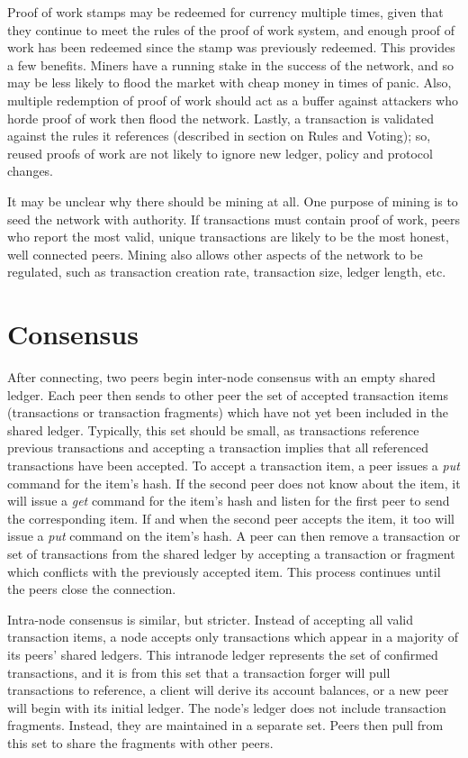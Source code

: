 \documentclass[10pt,twocolumn]{article}
\begin{document}
Proof of work stamps may be redeemed for currency multiple times, given that they continue to meet the rules of the proof of work system, and enough proof of work has been redeemed since the stamp was previously redeemed.  This provides a few benefits.  Miners have a running stake in the success of the network, and so may be less likely to flood the market with cheap money in times of panic.  Also, multiple redemption of proof of work should act as a buffer against attackers who horde proof of work then flood the network.  Lastly, a transaction is validated against the rules it references (described in section on Rules and Voting); so, reused proofs of work are not likely to ignore new ledger, policy and protocol changes.

It may be unclear why there should be mining at all.  One purpose of mining is to seed the network with authority.  If transactions must contain proof of work, peers who report the most valid, unique transactions are likely to be the most honest, well connected peers.  Mining also allows other aspects of the network to be regulated, such as transaction creation rate, transaction size, ledger length, etc.

\section{Consensus}
After connecting, two peers begin inter-node consensus with an empty shared ledger.  Each peer then sends to other peer the set of accepted transaction items (transactions or transaction fragments) which have not yet been included in the shared ledger.  Typically, this set should be small, as transactions reference previous transactions and accepting a transaction implies that all referenced transactions have been accepted.  To accept a transaction item, a peer issues a {\em put} command for the item's hash.  If the second peer does not know about the item, it will issue a {\em get} command for the item's hash and listen for the first peer to send the corresponding item.  If and when the second peer accepts the item, it too will issue a {\em put} command on the item's hash.  A peer can then remove a transaction or set of transactions from the shared ledger by accepting a transaction or fragment which conflicts with the previously accepted item.  This process continues until the peers close the connection.

Intra-node consensus is similar, but stricter.  Instead of accepting all valid transaction items, a node accepts only transactions which appear in a majority of its peers' shared ledgers.  This intranode ledger represents the set of confirmed transactions, and it is from this set that a transaction forger will pull transactions to reference, a client will derive its account balances, or a new peer will begin with its initial ledger.  The node's ledger does not include transaction fragments.  Instead, they are maintained in a separate set.  Peers then pull from this set to share the fragments with other peers.
\end{document}

